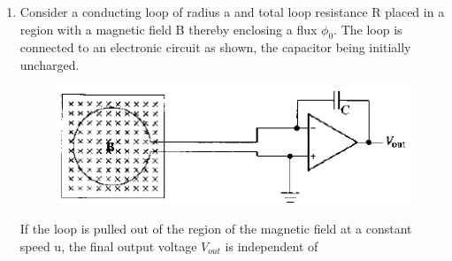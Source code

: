 \documentclass[journal,12pt,onecolumn]{IEEEtran}
\theoremstyle{remark}
\begin{document}
\begin{enumerate}
\begin{enumerate}  \end{enumerate}

\item Consider a conducting loop of radius a and total loop resistance R placed in a region with a magnetic field B thereby enclosing a flux $\phi_0$. The loop is connected to an electronic circuit as shown, the capacitor being initially uncharged.
	\begin{figure}[H]
	\centering
		\caption*{} \label{39} \caption*{} \label{} \includegraphics[width=0.8\columnwidth]{figs/39.png}
	\end{figure}
	If the loop is pulled out of the region of the magnetic field at a constant speed u, the final output voltage $V_{out}$ is independent of\hfill{}


\begin{enumerate}  \end{enumerate}


\end{enumerate}
\end{document}
